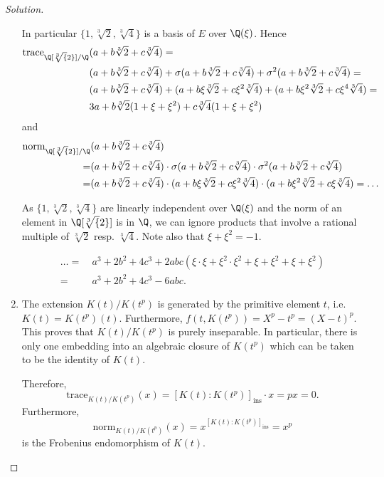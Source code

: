 \documentclass[a4paper,10pt,reqno]{amsart}
\newenvironment{sol}
  {\renewcommand\qedsymbol{$\blacksquare$}\begin{proof}[Solution]}
  {\end{proof}}
\begin{document}
\begin{sol}
\begin{enumerate}[label=(\roman*)]
     In particular $\{1,\sqrt[3]{2},\sqrt[3]{4}\}$ is a
     basis of $E$ over $\Q(\xi)$.
     Hence
     \begin{align*}
     \mathrm{trace}_{\Q[\sqrt[3]{2}]/\Q}&(a+b\sqrt[3]{2}+c\sqrt[3]{4})=\\
     &(a+b\sqrt[3]{2}+c\sqrt[3]{4})+\sigma(a+b\sqrt[3]{2}+c\sqrt[3]{4})+\sigma^2(a+b\sqrt[3]{2}+c\sqrt[3]{4})=\\
     &(a+b\sqrt[3]{2}+c\sqrt[3]{4})+(a+b\xi\sqrt[3]{2}+c\xi^2\sqrt[3]{4})+(a+b\xi^2\sqrt[3]{2}+c\xi^4\sqrt[3]{4})=\\
      &3a+b\sqrt[3]{2}(1+\xi+\xi^2)+c\sqrt[3]{4}(1+\xi+\xi^2)
     \end{align*}
    and       
     \begin{align*}
         \mathrm{norm}_{\Q[\sqrt[3]{2}]/\Q}&(a+b\sqrt[3]{2}+c\sqrt[3]{4}) \\
      = &(a+b\sqrt[3]{2}+c\sqrt[3]{4})\cdot \sigma(a+b\sqrt[3]{2}+c\sqrt[3]{4}) \cdot \sigma^2(a+b\sqrt[3]{2}+c\sqrt[3]{4}) \\
      = & (a+b\sqrt[3]{2}+c\sqrt[3]{4}) \cdot (a+b\xi\sqrt[3]{2}+c\xi^2\sqrt[3]{4}) \cdot (a+b\xi^2\sqrt[3]{2}+c\xi\sqrt[3]{4}) = \ldots
     \end{align*}

     As   $\{1,\sqrt[3]{2},\sqrt[3]{4}\}$ are linearly independent over $\Q(\xi)$ and the norm of an element in $\Q[\sqrt[3]{2}]$ is in $\Q$, we can ignore products that involve a rational multiple of $\sqrt[3]{2}$ resp. $\sqrt[3]{4}$. Note also that $\xi + \xi^2 = -1$.

     \begin{align*}
         \ldots  = & \ a^3 + 2b^2 + 4c^3 + 2abc(\xi \cdot \xi + \xi^2 \cdot \xi^2 + \xi + \xi^2 + \xi + \xi^2) \\
         = & \ a^3 + 2b^2 + 4c^3 -6abc.
     \end{align*}

     \item The extension $K(t)/K(t^p)$ is generated by the primitive element $t$, i.e. $K(t) = K(t^p)(t)$. Furthermore, $f(t,K(t^p)) = X^p - t^p = (X-t)^p$. This proves that $K(t)/K(t^p)$ is purely inseparable. In particular, there is only one embedding into an algebraic closure of $K(t^p)$ which can be taken to be the identity of $K(t)$.

    Therefore,
    \[
    \mathrm{trace}_{K(t)/K(t^p)}(x) = [K(t):K(t^p)]_{\mathrm{ins}} \cdot x = px = 0.
    \]
    Furthermore,
    \[
    \mathrm{norm}_{K(t)/K(t^p)}(x) = x^{[K(t):K(t^p)]_{\mathrm{ins}}} = x^p
    \]
    is the Frobenius endomorphism of $K(t)$.\qedhere
\end{enumerate}
\end{sol}
\end{document}
